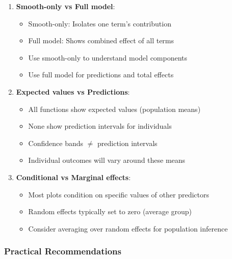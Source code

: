 \documentclass[12pt]{article}
\begin{document}
\begin{enumerate}
\item \textbf{Smooth-only vs Full model}: 
   \begin{itemize}
   \item Smooth-only: Isolates one term's contribution
   \item Full model: Shows combined effect of all terms
   \item Use smooth-only to understand model components
   \item Use full model for predictions and total effects
   \end{itemize}

\item \textbf{Expected values vs Predictions}:
   \begin{itemize}
   \item All functions show expected values (population means)
   \item None show prediction intervals for individuals
   \item Confidence bands $\neq$ prediction intervals
   \item Individual outcomes will vary around these means
   \end{itemize}

\item \textbf{Conditional vs Marginal effects}:
   \begin{itemize}
   \item Most plots condition on specific values of other predictors
   \item Random effects typically set to zero (average group)
   \item Consider averaging over random effects for population inference
   \end{itemize}
\end{enumerate}

\subsubsection{Practical Recommendations}
\end{document}
